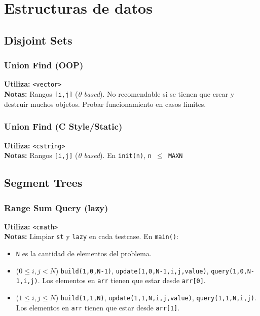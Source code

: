 \section{Estructuras de datos}

\subsection{Disjoint Sets}
\subsubsection{Union Find (OOP)}
\begin{footnotesize}
	\textbf{Utiliza:} \texttt{<vector>}\\
	\textbf{Notas:} Rangos \texttt{[i,j]} (\textit{0 based}). No recomendable si se tienen que crear y destruir muchos objetos. Probar funcionamiento en casos l\'imites. 
\end{footnotesize}

\subsubsection{Union Find (C Style/Static)}
\begin{footnotesize}
	\textbf{Utiliza:} \texttt{<cstring>}\\
	\textbf{Notas:} Rangos \texttt{[i,j]} (\textit{0 based}). En \texttt{init(n)}, \texttt{n $\leq$ MAXN}
\end{footnotesize}


\subsection{Segment Trees}
\subsubsection{Range Sum Query (lazy)}
\begin{footnotesize}
	\textbf{Utiliza:} \texttt{<cmath>}\\
	\textbf{Notas:} Limpiar \texttt{st} y \texttt{lazy} en cada testcase. En \texttt{main()}: \\
	\begin{itemize}
		\item \texttt{N} es la cantidad de elementos del problema.
		\item ($ 0 \leq i,j < N $) \texttt{build(1,0,N-1)}, \texttt{update(1,0,N-1,i,j,value)}, \texttt{query(1,0,N-1,i,j)}. Los elementos en \texttt{arr} tienen que estar desde \texttt{arr[0]}.
		\item ($ 1 \leq i,j \leq N $) \texttt{build(1,1,N)}, \texttt{update(1,1,N,i,j,value)}, \texttt{query(1,1,N,i,j)}. Los elementos en \texttt{arr} tienen que estar desde \texttt{arr[1]}.
	\end{itemize}
\end{footnotesize}


